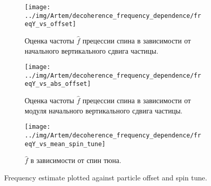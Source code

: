 \documentclass{report}
\begin{document}
\begin{figure}[H]
  \centering
  \begin{subfigure}[b]{\textwidth}
    \texttt{[image: ../img/Artem/decoherence\_frequency\_dependence/freqY\_vs\_offset]}
    \caption{Оценка частоты $\hat f$ прецессии спина в зависимости от начального вертикального сдвига частицы.}
  \end{subfigure}

  \begin{subfigure}[b]{\textwidth}
    \texttt{[image: ../img/Artem/decoherence\_frequency\_dependence/freqY\_vs\_abs\_offset]}
    \caption{Оценка частоты $\hat f$ прецессии спина в зависимости от модуля начального вертикального сдвига частицы.}
  \end{subfigure}

  \begin{subfigure}[b]{\textwidth}
    \texttt{[image: ../img/Artem/decoherence\_frequency\_dependence/freqY\_vs\_mean\_spin\_tune]}
    \caption{$\hat f$ в зависимости от спин тюна.}
  \end{subfigure}
  \caption{Frequency estimate plotted against particle offset and spin tune.}
\end{figure}
\end{document}
